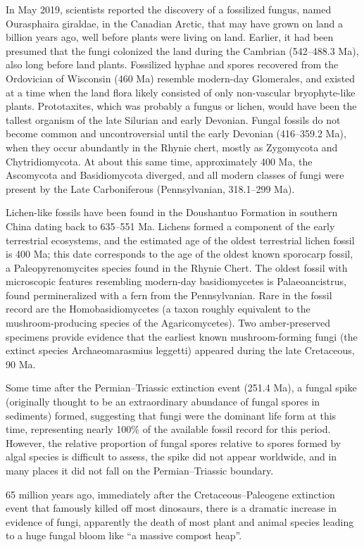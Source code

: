 In May 2019, scientists reported the discovery of a fossilized fungus, named Ourasphaira giraldae, in the Canadian Arctic, that may have grown on land a billion years ago, well before plants were living on land. Earlier, it had been presumed that the fungi colonized the land during the Cambrian (542--488.3 Ma), also long before land plants. Fossilized hyphae and spores recovered from the Ordovician of Wisconsin (460 Ma) resemble modern-day Glomerales, and existed at a time when the land flora likely consisted of only non-vascular bryophyte-like plants. Prototaxites, which was probably a fungus or lichen, would have been the tallest organism of the late Silurian and early Devonian. Fungal fossils do not become common and uncontroversial until the early Devonian (416--359.2 Ma), when they occur abundantly in the Rhynie chert, mostly as Zygomycota and Chytridiomycota. At about this same time, approximately 400 Ma, the Ascomycota and Basidiomycota diverged, and all modern classes of fungi were present by the Late Carboniferous (Pennsylvanian, 318.1--299 Ma).

Lichen-like fossils have been found in the Doushantuo Formation in southern China dating back to 635--551 Ma. Lichens formed a component of the early terrestrial ecosystems, and the estimated age of the oldest terrestrial lichen fossil is 400 Ma; this date corresponds to the age of the oldest known sporocarp fossil, a Paleopyrenomycites species found in the Rhynie Chert. The oldest fossil with microscopic features resembling modern-day basidiomycetes is Palaeoancistrus, found permineralized with a fern from the Pennsylvanian. Rare in the fossil record are the Homobasidiomycetes (a taxon roughly equivalent to the mushroom-producing species of the Agaricomycetes). Two amber-preserved specimens provide evidence that the earliest known mushroom-forming fungi (the extinct species Archaeomarasmius leggetti) appeared during the late Cretaceous, 90 Ma.

Some time after the Permian--Triassic extinction event (251.4 Ma), a fungal spike (originally thought to be an extraordinary abundance of fungal spores in sediments) formed, suggesting that fungi were the dominant life form at this time, representing nearly 100\% of the available fossil record for this period. However, the relative proportion of fungal spores relative to spores formed by algal species is difficult to assess, the spike did not appear worldwide, and in many places it did not fall on the Permian--Triassic boundary.

65 million years ago, immediately after the Cretaceous--Paleogene extinction event that famously killed off most dinosaurs, there is a dramatic increase in evidence of fungi, apparently the death of most plant and animal species leading to a huge fungal bloom like ``a massive compost heap''.

